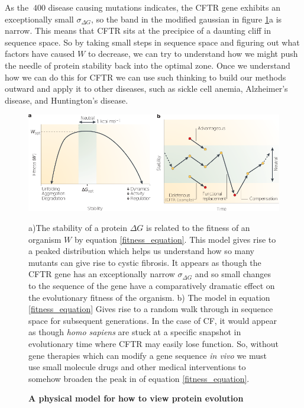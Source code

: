 As the $\>400$ disease causing mutations indicates\cite{cftr2}, the CFTR gene exhibits an exceptionally small $\sigma_{\Delta G}$, so the band in the modified gaussian in figure \ref{fitness_landscape_figure}a is narrow. This means that CFTR sits at the precipice of a daunting cliff in sequence space.  So by taking small steps in sequence space and figuring out what factors have caused $W$ to decrease, we can try to understand how we might push the needle of protein stability back into the optimal zone. Once we understand how we can do this for CFTR we can use such thinking to build our methods outward and apply it to other diseases, such as sickle cell anemia, Alzheimer's disease, and Huntington's disease\cite{depristo2005}.

\begin{figure}
	\begin{center}
		\includegraphics[width=1.0\textwidth]{figures/fitness_landscape_fig.pdf}
	\end{center}
	\captionsetup{singlelinecheck = false, justification=raggedright}
	\caption[A physical model for how to view protein evolution] {\textbf{A physical model for how to view protein evolution}}{a)The stability of a protein $\Delta G$ is related to the fitness of an organism $W$ by equation \ref{fitness_equation}. This model gives rise to a peaked distribution which helps us understand how so many mutants can give rise to cystic fibrosis. It appears as though the CFTR gene has an exceptionally narrow $\sigma_{\Delta G}$ and so small changes to the sequence of the gene have a comparatively dramatic effect on the evolutionary fitness of the organism. b) The model in equation \ref{fitness_equation} Gives rise to a random walk through in sequence space for subsequent generations. In the case of CF, it would appear as though \textit{homo sapiens} are stuck at a specific snapshot in evolutionary time where CFTR may easily lose function. So, without gene therapies which can modify a gene sequence \textit {in vivo} we must use small molecule drugs and other medical interventions to somehow broaden the peak in of equation \ref{fitness_equation}.}
	\label{fitness_landscape_figure}
\end{figure}

